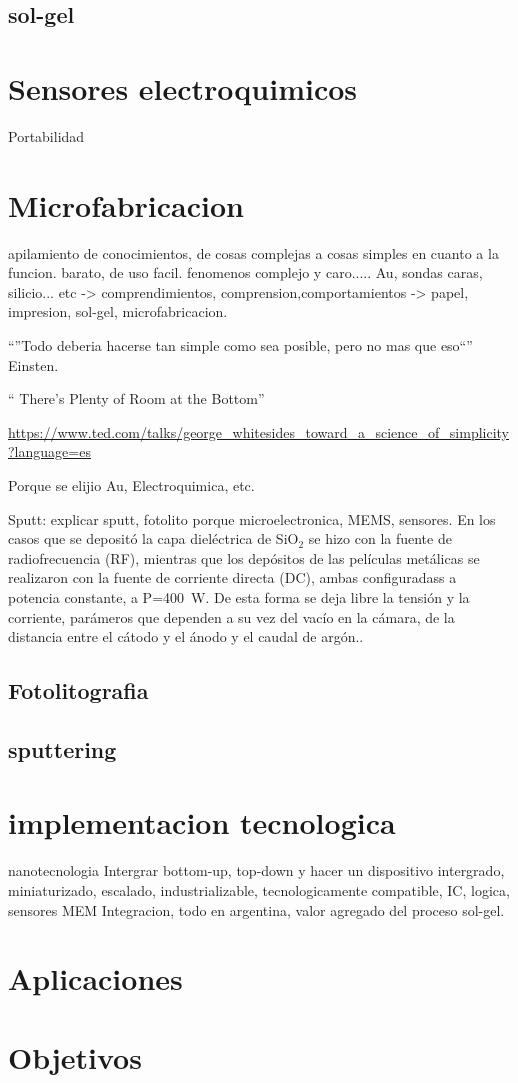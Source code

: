 	\subsection{sol-gel}	

\section{Sensores electroquimicos}

Portabilidad

\section{Microfabricacion}\label{sec:microfabricacion}
apilamiento de conocimientos, de cosas complejas a cosas simples en cuanto a la funcion. barato, de uso facil.
fenomenos complejo y caro..... Au, sondas caras, silicio... etc -> comprendimientos, comprension,comportamientos -> papel, impresion, sol-gel, \cite{Whitesides2015,Burdass2010}microfabricacion.

``''Todo deberia hacerse tan simple como sea posible, pero no mas que eso``'' Einsten.

`` There's Plenty of Room at the Bottom''

\url{https://www.ted.com/talks/george_whitesides_toward_a_science_of_simplicity?language=es}\cite{ted_whitesides2010}

Porque se elijio Au, Electroquimica, etc.

Sputt: explicar sputt, fotolito porque microelectronica, MEMS, sensores.
En los casos que se depositó la capa dieléctrica de SiO$_2$ se hizo con la fuente de radiofrecuencia (RF), mientras que los depósitos de las películas metálicas se realizaron con la fuente de corriente directa (DC), ambas configuradass a potencia constante, a P=\SI{400}{\watt}.  De esta forma se deja libre la tensión y la corriente, parámeros que dependen a su vez del vacío en la cámara, de la distancia entre el cátodo y el ánodo y el caudal de argón.\cite{sigmund1968}. 

\subsection{Fotolitografia}\label{sec:intro_fotolito}

\subsection{sputtering}

\section{implementacion tecnologica}
nanotecnologia\cite{Gimenez2017}
Intergrar bottom-up, top-down y hacer un dispositivo intergrado, miniaturizado, escalado, industrializable, tecnologicamente compatible, IC, logica, sensores MEM
Integracion, todo en argentina, valor agregado del proceso sol-gel.\cite{Volksen2010}

\section{Aplicaciones}

\section{Objetivos}